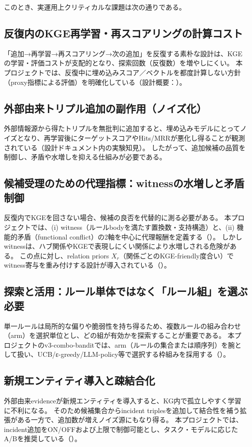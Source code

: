 \documentclass[11pt]{article}
\begin{document}
このとき、実運用上クリティカルな課題は次の通りである。

\subsection{反復内のKGE再学習・再スコアリングの計算コスト}
「追加→再学習→再スコアリング→次の追加」を反復する素朴な設計は、KGEの学習・評価コストが支配的となり、探索回数（反復数）を増やしにくい。
本プロジェクトでは、反復中に埋め込みスコア／ベクトルを都度計算しない方針（proxy指標による評価）を明確化している（設計概要：\cite{rule_combo_bandit_overview,rule_arm_pipeline_impl}）。

\subsection{外部由来トリプル追加の副作用（ノイズ化）}
外部情報源から得たトリプルを無批判に追加すると、埋め込みモデルにとってノイズとなり、再学習後にターゲットスコアやHits/MRRが悪化し得ることが観測されている（設計ドキュメント内の実験知見）。
したがって、追加候補の品質を制御し、矛盾や水増しを抑える仕組みが必要である。

\subsection{候補受理のための代理指標：witnessの水増しと矛盾制御}
反復内でKGEを回さない場合、候補の良否を代替的に測る必要がある。
本プロジェクトでは、(i) witness（ルールbodyを満たす置換数・支持構造）と、(ii) 機能的矛盾（functional conflict）の2軸を中心に代理報酬を定義する（\cite{rule_combo_bandit_overview,rule_arm_pipeline_impl}）。
しかしwitnessは、ハブ関係やKGEで表現しにくい関係により水増しされる危険がある。
この点に対し、relation priors $X_r$（関係ごとのKGE-friendly度合い）でwitness寄与を重み付けする設計が導入されている（\cite{rule_relation_priors}）。

\subsection{探索と活用：ルール単体ではなく「ルール組」を選ぶ必要}
単一ルールは局所的な偏りや脆弱性を持ち得るため、複数ルールの組み合わせ（arm）を選択単位とし、どの組が有効かを探索することが重要である。
本プロジェクトのv3-combo-banditでは、arm（ルールの集合または順序列）を腕として扱い、UCB/ε-greedy/LLM-policy等で選択する枠組みを採用する（\cite{rule_combo_bandit_overview}）。

\subsection{新規エンティティ導入と疎結合化}
外部由来evidenceが新規エンティティを導入すると、KG内で孤立しやすく学習に不利になる。
そのため候補集合からincident triplesを追加して結合性を補う拡張がある一方で、追加数が増えノイズ源にもなり得る。
本プロジェクトでは、incident追加をON/OFFおよび上限で制御可能とし、タスク・モデルに応じたA/Bを推奨している（\cite{rule_arm_pipeline_impl}）。
\end{document}
